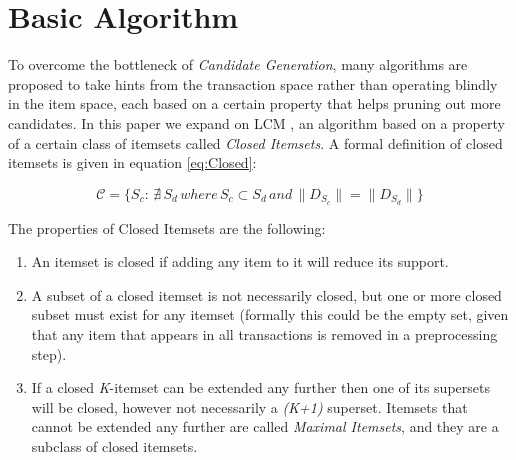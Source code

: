 \documentclass{sig-alternate}
\begin{document}
\section{Basic Algorithm}
To overcome the bottleneck of \emph{Candidate Generation}, many algorithms are proposed to take hints from the transaction space rather than operating blindly in the item space, each based on a certain property that helps pruning out more candidates. In this paper we expand on LCM \cite{lcm}, an algorithm based on a property of a certain class of itemsets called \emph{Closed Itemsets}. A formal definition of closed itemsets is given in equation \ref{eq:Closed}: 

\begin{equation}\label{eq:Closed}\mathcal{C} = \{S_c:\, \nexists \, S_d \, where \, S_c  \subset S_d \, and \, \|D_{S_c}\| = \|D_{S_d}\|\}\end{equation}

The properties of Closed Itemsets are the following:
\begin{enumerate}
\item An itemset is closed if adding any item to it will reduce its support. 
\item A subset of a closed itemset is not necessarily closed, but one or more closed subset must exist for any itemset (formally this could be the empty set, given that any item that appears in all transactions is removed in a preprocessing step). 
\item If a closed \emph{K}-itemset can be extended any further then one of its supersets will be closed, however not necessarily a \emph{(K+1)} superset. Itemsets that cannot be extended any further are called \emph{Maximal Itemsets}, and they are a subclass of closed itemsets.
\end{enumerate}
\end{document}
